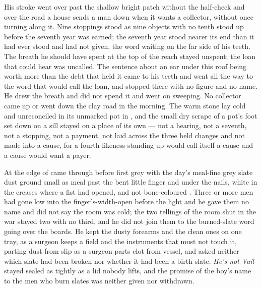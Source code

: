 His stroke went over  past the shallow bright patch without the half-check and over the road a house sends a man down when it wants a collector, without once turning along it. Nine stoppings stood as nine objects with no tenth stood up before the seventh year was earned; the seventh year stood nearer its end than it had ever stood and had not given, the word waiting on the far side of his teeth. The breath he should have spent at the top of the reach stayed unspent; the loan that could hear was uncalled. The sentence about an ear under this roof being worth more than the debt that held it came to his teeth and went all the way to the word that would call the loan, and stopped there with no figure and no name. He drew the breath and did not spend it and went on sweeping. No collector came up or went down the clay road in the morning. The warm stone lay cold and unreconciled in its unmarked pot in , and the small dry scrape of a pot's foot set down on a sill stayed on a place of its own --- not a hearing, not a seventh, not a stopping, not a payment, not laid across the three held changes and not made into a cause, for a fourth likeness standing up would call itself a cause and a cause would want a payer.

\scenebreak

At the edge of   came through before first grey with the day's meal-fine grey slate dust ground small as meal past the bent little finger and under the nails, white in the creases where a fist had opened, and not bone-coloured . Three or more men had gone low into the finger's-width-open  before the light and he gave them no name and did not say the room was cold; the two tellings of the room shut in the war stayed two with no third, and he did not join them to the burned-slate word going over the boards. He kept the dusty forearms and the clean ones on one tray, as a surgeon keeps a field and the instruments that must not touch it, parting dust from slip as a surgeon parts clot from vessel, and asked neither which slate had been broken nor whether it had been a birth-slate. \emph{He's not Vail} stayed sealed as tightly as a lid nobody lifts, and the promise of the boy's name to the men who burn slates was neither given nor withdrawn.

